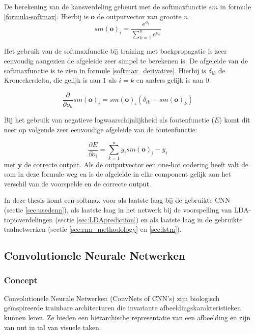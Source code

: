De berekening van de kansverdeling gebeurt met de softmaxfunctie $sm$ in formule \eqref{formula-softmax}. Hierbij is $\mathbf{o}$ de outputvector van grootte $n$.
\begin{equation}
sm(\textbf{o})_i = \frac{e^{o_i}}{\sum^{n}_{k=1}{e^{o_k}}}
\label{formula-softmax}
\end{equation}

Het gebruik van de softmaxfunctie bij training met backpropagatie is zeer eenvoudig aangezien de afgeleide zeer simpel te berekenen is. De afgeleide van de softmaxfunctie is te zien in formule \eqref{softmax_derivative}. Hierbij is $\delta_{ik}$ de Kroneckerdelta, die gelijk is aan $1$ als $i = k$ en anders gelijk is aan $0$.

\begin{equation}
    \frac{\partial}{\partial o_k}sm(\textbf{o})_i =  sm(\textbf{o})_i(\delta_{ik} - sm(\textbf{o})_k)
    \label{softmax_derivative}
\end{equation}

Bij het gebruik van negatieve logwaarschijnlijkheid als foutenfunctie ($E$) komt dit neer op volgende zeer eenvoudige afgeleide van de foutenfunctie:

\begin{equation}
    \frac{\partial E}{\partial o_i} = \sum_{k=1}^n{y_i}sm(\textbf{o})_i - y_i
\end{equation}
met $\textbf{y}$ de correcte output. Als de outputvector een one-hot codering heeft valt de som in deze formule weg en is de afgeleide in elke component gelijk aan het verschil van de voorspelde en de correcte output\cite{Bishop:1995:NNP:525960}. 

In deze thesis komt een softmax voor als laatste laag bij de gebruikte CNN (sectie \ref{sec:usedcnn}), als laatste laag in het netwerk bij de voorspelling van LDA-topicverdelingen (sectie \ref{sec:LDAprediction}) en als laatste laag in de gebruikte taalnetwerken (sectie \ref{sec:rnn_methodology} en \ref{sec:lstm}).

\subsection{Convolutionele Neurale Netwerken}
\label{sec:CNN}
\subsubsection{Concept}
Convolutionele Neurale Netwerken (ConvNets of CNN's) zijn biologisch ge\" inspireerde trainbare architecturen die invariante afbeeldingskarakteristieken kunnen leren\cite{LeCun2010}. Ze bieden een hi\"erarchische representatie van een afbeelding en zijn van nut in tal van visuele taken\cite{Ciresan2012,Girshick2014,Zhou2015}.

